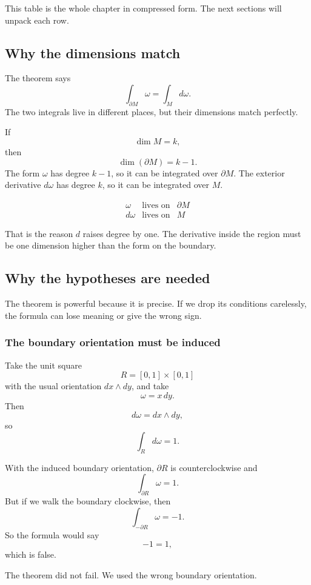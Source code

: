 This table is the whole chapter in compressed form.  The next sections will unpack
each row.

\subsection{Why the dimensions match}

The theorem says
\[
    \int_{\partial M}\omega=\int_M d\omega.
\]
The two integrals live in different places, but their dimensions match perfectly.

If
\[
    \dim M=k,
\]
then
\[
    \dim(\partial M)=k-1.
\]
The form \(\omega\) has degree \(k-1\), so it can be integrated over \(\partial M\).
The exterior derivative \(d\omega\) has degree \(k\), so it can be integrated over \(M\).

\[
\boxed{
\begin{array}{ccc}
\omega & \text{lives on} & \partial M\\[1mm]
d\omega & \text{lives on} & M
\end{array}
}
\]

That is the reason \(d\) raises degree by one.  The derivative inside the region must be
one dimension higher than the form on the boundary.

\subsection{Why the hypotheses are needed}

The theorem is powerful because it is precise.  If we drop its conditions carelessly, the
formula can lose meaning or give the wrong sign.

\subsubsection*{The boundary orientation must be induced}

Take the unit square
\[
    R=[0,1]\times[0,1]
\]
with the usual orientation \(dx\wedge dy\), and take
\[
    \omega=x\,dy.
\]
Then
\[
    d\omega=dx\wedge dy,
\]
so
\[
    \int_R d\omega=1.
\]

With the induced boundary orientation, \(\partial R\) is counterclockwise and
\[
    \int_{\partial R}\omega=1.
\]
But if we walk the boundary clockwise, then
\[
    \int_{-\partial R}\omega=-1.
\]
So the formula would say
\[
    -1=1,
\]
which is false.

The theorem did not fail.  We used the wrong boundary orientation.

